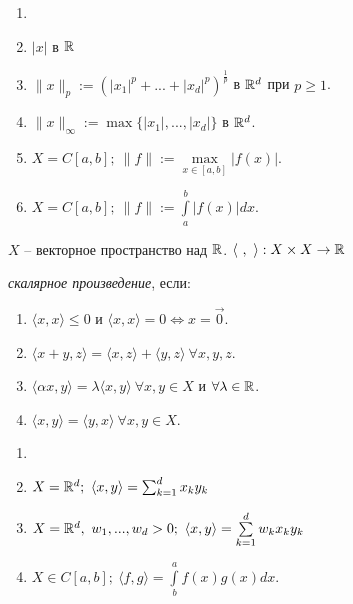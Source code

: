 \begin{example}
    \begin{enumerate}
        \item[]
        \item $|x|$ в $\mathbb{R}$
        \item $\|x\|_p:=(|x_1|^p+...+|x_d|^p)^{\frac{1}{p}}$ в $\mathbb{R}^d$ при $p\geq 1$.
        \item $\|x\|_\infty:=\max\{|x_1|, ..., |x_d|\}$ в $\mathbb{R}^d$.
        \item $X=C[a,b];\ \|f\|:=\underset{x\in[a,b]}{\max}|f(x)|$.
        \item $X=C[a,b];\ \|f\|:=\int\limits_a^b|f(x)|dx$.
    \end{enumerate}
\end{example}

\begin{definition}
    $X$ – векторное пространство над $\mathbb{R}$. $\langle \ ,\ \rangle:X\times X\rightarrow \mathbb{R}$

    \textit{скалярное произведение}, если:
    \begin{enumerate}
        \item $\langle x,x \rangle\leq 0$ и $\langle x,x\rangle=0\Leftrightarrow x=\vec{0}$.
        \item $\langle x+y, z\rangle=\langle x,z \rangle +\langle y, z\rangle\ \forall x,y,z$.
        \item $\langle\alpha x, y \rangle=\lambda\langle x,y \rangle\ \forall x,y\in X$ и $\forall\lambda\in \mathbb{R}$.
        \item $\langle x,y\rangle=\langle y,x\rangle\ \forall x,y\in X$.
    \end{enumerate}
\end{definition}

\begin{example}
    \begin{enumerate}
        \item[]
        \item $X=\mathbb{R}^d;\ \langle x,y\rangle=\sum_{k=1}^d x_ky_k$
        \item $X=\mathbb{R}^d,\ w_1,...,w_d>0;\ \langle x,y\rangle=\sum\limits_{k=1}^d w_k x_k y_k$
        \item $X\in C[a,b];\ \langle f,g\rangle=\int\limits_b^af(x)g(x)dx$.
    \end{enumerate}
\end{example}

